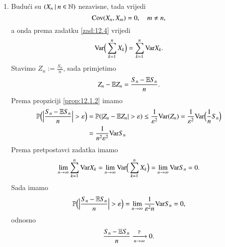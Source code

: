 \begin{rj}[\ref{zad:12.6}]
    \begin{enumerate}[label=(\alph*)]
        \item Budu\' ci su $({X_n} \: | \: {n \in \mathbb{N}})$ nezavisne, tada vrijedi
        \begin{equation*}
            \mathrm{Cov} (X_n, X_m) = 0, \quad m \neq n,
        \end{equation*}
        a onda prema zadatku \ref{zad:12.4} vrijedi
        \begin{equation*}
            \mathrm{Var} \Big( \sum\limits_{k = 1}^{n} X_k \Big) = \sum\limits_{k = 1}^{n} \mathrm{Var} X_k.
        \end{equation*}
        Stavimo $Z_n := \frac{S_n}{n}$, sada primjetimo
        \begin{equation*}
            Z_n - \mathbb{E} Z_n = \frac{S_n - \mathbb{E} S_n}{n}.
        \end{equation*}
        Prema propziciji \ref{prop:12.1.2} imamo
        \begin{equation*}
            \begin{aligned}
                \mathbb{P} \Big( \Big| \frac{S_n - \mathbb{E} S_n}{n} \Big| > \varepsilon \Big) &= \mathbb{P} ( | Z_n - \mathbb{E} Z_n | > \varepsilon ) \leq \frac{1}{\varepsilon^2} \mathrm{Var} (Z_n) = \frac{1}{\varepsilon^2} \mathrm{Var} \Big( \frac{1}{n} S_n \Big)\\
                &= \frac{1}{n^2 \varepsilon^2} \mathrm{Var} S_n
            \end{aligned}
        \end{equation*}
        Prema pretpostavci zadatka imamo
        \begin{equation*}
            \lim\limits_{n \to \infty} \sum\limits_{k = 1}^{n} \mathrm{Var} X_k = \lim\limits_{n \to \infty} \mathrm{Var} \Big( \sum\limits_{k = 1}^{n} X_k \Big) = \lim\limits_{n \to \infty} \mathrm{Var} S_n = 0.
        \end{equation*}
        Sada imamo
        \begin{equation*}
            \mathbb{P} \Big( \Big| \frac{S_n - \mathbb{E} S_n}{n} \Big| > \varepsilon \Big) = \lim\limits_{n \to \infty} \frac{1}{\varepsilon^2 n} \mathrm{Var} S_n = 0,
        \end{equation*}
        odnosno
        \begin{equation*}
            \frac{S_n - \mathbb{E} S_n}{n} \xrightarrow[n \to \infty]{\mathbb{P}} 0.
        \end{equation*}


\end{enumerate}
\end{rj}
